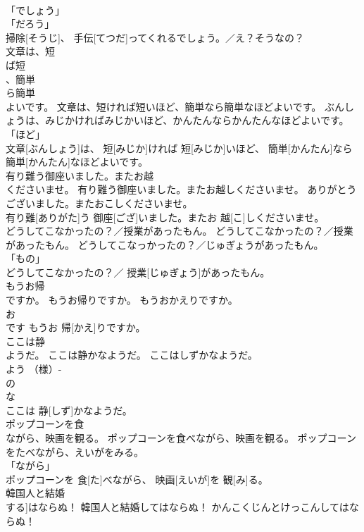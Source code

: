 \documentclass[8pt]{extreport}
\begin{document}
\begin{CJK}{UTF8}{min}
\\	「でしょう」 
\\	「だろう」 
\\	掃除[そうじ]、 手伝[てつだ]ってくれるでしょう。／え？そうなの？		
\\	文章は、短
\\	ば短
\\	、簡単
\\	ら簡単
\\	よいです。	文章は、短ければ短いほど、簡単なら簡単なほどよいです。	ぶんしょうは、みじかければみじかいほど、かんたんならかんたんなほどよいです。	
\\	「ほど」 
\\	文章[ぶんしょう]は、 短[みじか]ければ 短[みじか]いほど、 簡単[かんたん]なら 簡単[かんたん]なほどよいです。		
\\	有り難う御座いました。またお越
\\	くださいませ。	有り難う御座いました。またお越しくださいませ。	ありがとうございました。またおこしくださいませ。	
\\	有り難[ありがた]う 御座[ござ]いました。またお 越[こ]しくださいませ。		
\\	どうしてこなかったの？／授業があったもん。	どうしてこなかったの？／授業があったもん。	どうしてこなっかったの？／じゅぎょうがあったもん。	
\\	「もの」 
\\	どうしてこなかったの？／ 授業[じゅぎょう]があったもん。		
\\	もうお帰
\\	ですか。	もうお帰りですか。	もうおかえりですか。	
\\	お 
\\	です	もうお 帰[かえ]りですか。		
\\	ここは静
\\	ようだ。	ここは静かなようだ。	ここはしずかなようだ。	
\\	よう （様）- 
\\	の 
\\	な 
\\	ここは 静[しず]かなようだ。		
\\	ポップコーンを食
\\	ながら、映画を観る。	ポップコーンを食べながら、映画を観る。	ポップコーンをたべながら、えいがをみる。	
\\	「ながら」 
\\	ポップコーンを 食[た]べながら、 映画[えいが]を 観[み]る。		
\\	韓国人と結婚
\\	する]はならぬ！	韓国人と結婚してはならぬ！	かんこくじんとけっこんしてはならぬ！	

\end{CJK}
\end{document}
